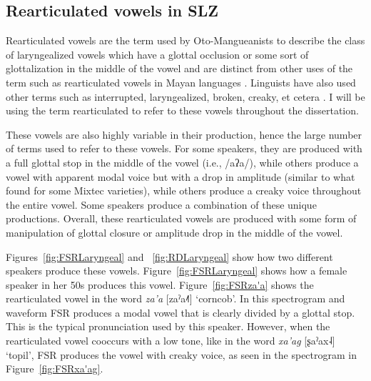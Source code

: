 \subsection{Rearticulated vowels in SLZ} \label{sec:SLZ-voicequality-rearticulated}
Rearticulated vowels are the term used by Oto-Mangueanists to describe the class of laryngealized vowels which have a glottal occlusion or some sort of glottalization in the middle of the vowel \citep{ariza-garciaPhonationTypesTones2018} and are distinct from other uses of the term such as rearticulated vowels in Mayan languages \citep{bairdPhoneticPhonologicalRealizations2011}. Linguists have also used other terms such as interrupted, laryngealized, broken, creaky, et cetera \citep{adlerAcousticsPhonationTypes2016,ariza-garciaPhonationTypesTones2018,avelinoAcousticElectroglottographicAnalyses2010,longDiccionarioZapotecoSan2005,sonnenscheinDescriptiveGrammarSan2005}. I will be using the term rearticulated to refer to these vowels throughout the dissertation.

These vowels are also highly variable in their production, hence the large number of terms used to refer to these vowels. For some speakers, they are produced with a full glottal stop in the middle of the vowel (i.e., /aʔa/), while others produce a vowel with apparent modal voice but with a drop in amplitude (similar to what \cite{gerfenProductionPerceptionLaryngealized2005} found for some Mixtec varieties), while others produce a creaky voice throughout the entire vowel. Some speakers produce a combination of these unique productions. Overall, these rearticulated vowels are produced with some form of manipulation of glottal closure or amplitude drop in the middle of the vowel.

Figures~\ref{fig:FSRLaryngeal} and ~\ref{fig:RDLaryngeal} show how two different speakers produce these vowels. Figure~\ref{fig:FSRLaryngeal} shows how a female speaker in her 50s produces this vowel. Figure~\ref{fig:FSRza'a} shows the rearticulated vowel in the word \textit{za'a} [zaˀa˨˥] `corncob'. In this spectrogram and waveform FSR produces a modal vowel that is clearly divided by a glottal stop. This is the typical pronunciation used by this speaker. However, when the rearticulated vowel cooccurs with a low tone, like in the word \textit{xa'ag} [ʂaˀax˨] `topil', FSR produces the vowel with creaky voice, as seen in the spectrogram in Figure~\ref{fig:FSRxa'ag}.

